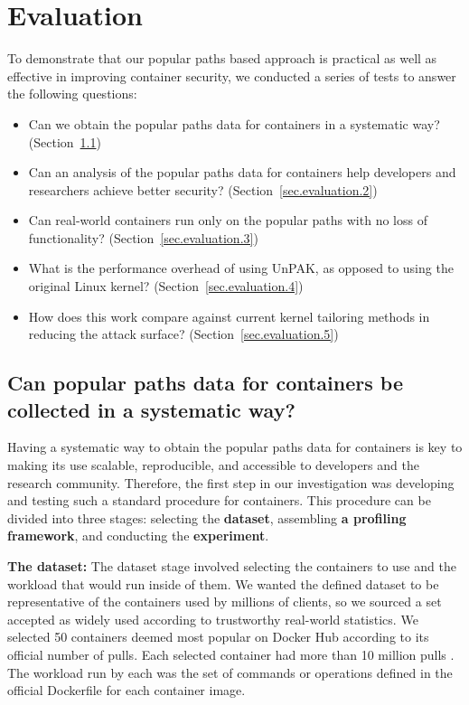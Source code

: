 \section{Evaluation}
\label{sec.evaluation}
To demonstrate that our popular paths based approach is practical as well as effective in improving container security, 
we conducted a series of tests to answer the following questions: 
\begin{itemize}
	\item Can we obtain the popular paths data for containers in a systematic way? (Section~{\ref{sec.evaluation.1}})
	\item Can an analysis of the popular paths data for containers help developers and researchers achieve better security? (Section~{\ref{sec.evaluation.2}})
	\item Can real-world containers run only on the popular paths with no loss of functionality? (Section~{\ref{sec.evaluation.3}})
	\item What is the performance overhead of using UnPAK, as opposed to using the original Linux kernel? (Section~{\ref{sec.evaluation.4}})
	\item How does this work compare against current kernel tailoring methods in reducing the attack surface? (Section~{\ref{sec.evaluation.5}})
\end{itemize}

\subsection{Can popular paths data for containers be collected in a systematic way?}
\label{sec.evaluation.1} 
Having a systematic way to obtain the popular paths data for containers is key to making its use scalable, reproducible, and accessible to developers and the research community. 
Therefore, the first step in our investigation was developing and testing such a standard procedure for containers. 
This procedure can be divided into three stages: selecting the \textbf{dataset}, assembling \textbf{a profiling framework}, and conducting the \textbf{experiment}. 

\textbf{The dataset:} The dataset stage involved selecting the containers to use and the workload that would run inside of them. 
We wanted the defined dataset to be representative of the containers used by millions of clients, so we sourced a set accepted as widely used according to trustworthy real-world statistics. 
We selected 50 containers deemed most popular on Docker Hub according to its official number of pulls. Each selected container had more than 10 million pulls \cite{DockerHub}. 
The workload run by each was the set of commands or operations defined in the official Dockerfile for each container image. 

